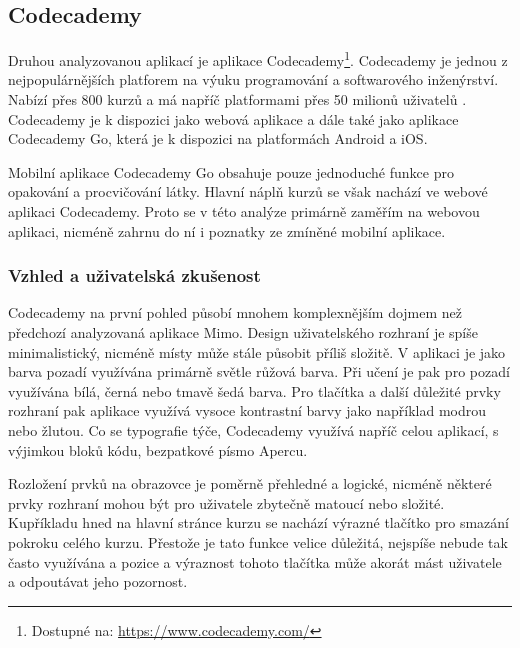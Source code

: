 \subsection{Codecademy}

Druhou analyzovanou aplikací je aplikace Codecademy\footnote{Dostupné na: \href{https://www.codecademy.com/}{https://www.codecademy.com/}}. Codecademy je jednou z nejpopulárnějších platforem na výuku programování a softwarového inženýrství. Nabízí přes 800 kurzů \cite{CodecademyCourses} a má napříč platformami přes 50 milionů uživatelů \cite{CodecademyPartnerships}. Codecademy je k dispozici jako webová aplikace a dále také jako aplikace Codecademy Go, která je k dispozici na platformách Android a iOS.

Mobilní aplikace Codecademy Go obsahuje pouze jednoduché funkce pro opakování a procvičování látky. Hlavní náplň kurzů se však nachází ve webové aplikaci Codecademy. Proto se v této analýze primárně zaměřím na webovou aplikaci, nicméně zahrnu do ní i poznatky ze zmíněné mobilní aplikace.  

\subsubsection{Vzhled a uživatelská zkušenost}

Codecademy na první pohled působí mnohem komplexnějším dojmem než předchozí analyzovaná aplikace Mimo. Design uživatelského rozhraní je spíše minimalistický, nicméně místy může stále působit příliš složitě. V aplikaci je jako barva pozadí využívána primárně světle růžová barva. Při učení je pak pro pozadí využívána bílá, černá nebo tmavě šedá barva. Pro tlačítka a další důležité prvky rozhraní pak aplikace využívá vysoce kontrastní barvy jako například modrou nebo žlutou. Co se typografie týče, Codecademy využívá napříč celou aplikací, s výjimkou bloků kódu, bezpatkové písmo Apercu.

Rozložení prvků na obrazovce je poměrně přehledné a logické, nicméně některé prvky rozhraní mohou být pro uživatele zbytečně matoucí nebo složité. Kupříkladu hned na hlavní stránce kurzu se nachází výrazné tlačítko pro smazání pokroku celého kurzu. Přestože je tato funkce velice důležitá, nejspíše nebude tak často využívána a pozice a výraznost tohoto tlačítka může akorát mást uživatele a odpoutávat jeho pozornost.


